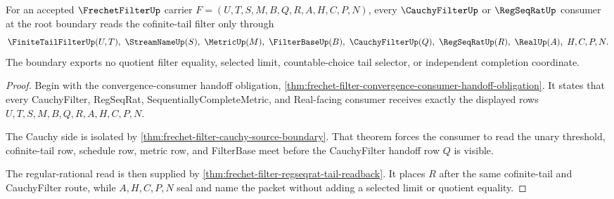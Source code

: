 \begin{theorem}
\label{thm:frechet-filter-root-cauchy-consumer-boundary}
For an accepted $\FrechetFilterUp$ carrier $F=(U,T,S,M,B,Q,R,A,H,C,P,N)$, every $\CauchyFilterUp$ or $\RegSeqRatUp$ consumer at the root boundary reads the cofinite-tail filter only through
$$
\FiniteTailFilterUp(U,T),\ \StreamNameUp(S),\ \MetricUp(M),\ \FilterBaseUp(B),\ \CauchyFilterUp(Q),\ \RegSeqRatUp(R),\ \RealUp(A),\ H,C,P,N .
$$
The boundary exports no quotient filter equality, selected limit, countable-choice tail selector, or independent completion coordinate.
\end{theorem}
\begin{proof}
Begin with the convergence-consumer handoff obligation, \autoref{thm:frechet-filter-convergence-consumer-handoff-obligation}. It states that every CauchyFilter, RegSeqRat, SequentiallyCompleteMetric, and Real-facing consumer receives exactly the displayed rows $U,T,S,M,B,Q,R,A,H,C,P,N$.

The Cauchy side is isolated by \autoref{thm:frechet-filter-cauchy-source-boundary}. That theorem forces the consumer to read the unary threshold, cofinite-tail row, schedule row, metric row, and FilterBase meet before the CauchyFilter handoff row $Q$ is visible.

The regular-rational read is then supplied by \autoref{thm:frechet-filter-regseqrat-tail-readback}. It places $R$ after the same cofinite-tail and CauchyFilter route, while $A,H,C,P,N$ seal and name the packet without adding a selected limit or quotient equality.
\end{proof}

